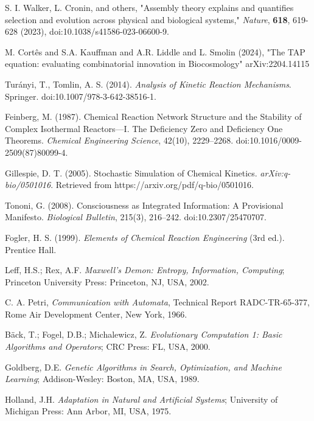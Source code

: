 \documentclass[preprint,12pt]{elsarticle}
\begin{document}
\begin{thebibliography}{999}
S. I. Walker, L. Cronin, and others,
"Assembly theory explains and quantifies selection and evolution across physical and biological systems," \textit{Nature}, \textbf{618}, 619-628 (2023), doi:10.1038/s41586-023-06600-9.

M. Cortês and S.A. Kauffman and A.R. Liddle and L. Smolin (2024), "The TAP equation: evaluating combinatorial innovation in Biocosmology" arXiv:2204.14115


Turányi, T., Tomlin, A. S. (2014). \textit{Analysis of Kinetic Reaction Mechanisms}. Springer. doi:10.1007/978-3-642-38516-1.

Feinberg, M. (1987). Chemical Reaction Network Structure and the Stability of Complex Isothermal Reactors—I. The Deficiency Zero and Deficiency One Theorems. \textit{Chemical Engineering Science}, 42(10), 2229–2268. doi:10.1016/0009-2509(87)80099-4.

Gillespie, D. T. (2005). Stochastic Simulation of Chemical Kinetics. \textit{arXiv:q-bio/0501016}. Retrieved from https://arxiv.org/pdf/q-bio/0501016.

Tononi, G. (2008). Consciousness as Integrated Information: A Provisional Manifesto. \textit{Biological Bulletin}, 215(3), 216–242. doi:10.2307/25470707.

Fogler, H. S. (1999). \textit{Elements of Chemical Reaction Engineering} (3rd ed.). Prentice Hall.

Leff, H.S.; Rex, A.F. \textit{Maxwell’s Demon: Entropy, Information, Computing}; Princeton University Press: Princeton, NJ, USA, 2002.

 C. A. Petri, \textit{Communication with Automata}, Technical Report RADC-TR-65-377, Rome Air Development Center, New York, 1966.

Bäck, T.; Fogel, D.B.; Michalewicz, Z. \textit{Evolutionary Computation 1: Basic Algorithms and Operators}; CRC Press: FL, USA, 2000.

Goldberg, D.E. \textit{Genetic Algorithms in Search, Optimization, and Machine Learning}; Addison-Wesley: Boston, MA, USA, 1989.

Holland, J.H. \textit{Adaptation in Natural and Artificial Systems}; University of Michigan Press: Ann Arbor, MI, USA, 1975.


\end{thebibliography}
\end{document}
